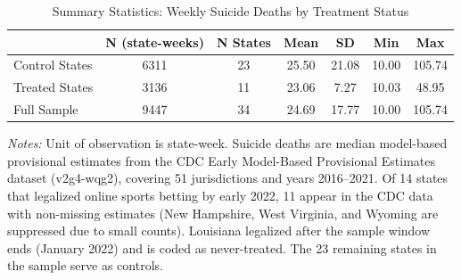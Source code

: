 \begin{table}[H]
\centering
\caption{Summary Statistics: Weekly Suicide Deaths by Treatment Status}
\begin{threeparttable}
\begin{tabular}{lcccccc}
\toprule
 & N (state-weeks) & N States & Mean & SD & Min & Max \\
\midrule
Control States & 6311 & 23 & 25.50 & 21.08 & 10.00 & 105.74 \\
Treated States & 3136 & 11 & 23.06 & 7.27 & 10.03 & 48.95 \\
Full Sample & 9447 & 34 & 24.69 & 17.77 & 10.00 & 105.74 \\
\bottomrule
\end{tabular}
\begin{tablenotes}[flushleft]
\small
\item \textit{Notes:} Unit of observation is state-week. Suicide deaths are median model-based provisional estimates from the CDC Early Model-Based Provisional Estimates dataset (v2g4-wqg2), covering 51 jurisdictions and years 2016--2021. Of 14 states that legalized online sports betting by early 2022, 11 appear in the CDC data with non-missing estimates (New Hampshire, West Virginia, and Wyoming are suppressed due to small counts). Louisiana legalized after the sample window ends (January 2022) and is coded as never-treated. The 23 remaining states in the sample serve as controls.
\end{tablenotes}
\end{threeparttable}
\label{tab:summary}
\end{table}

